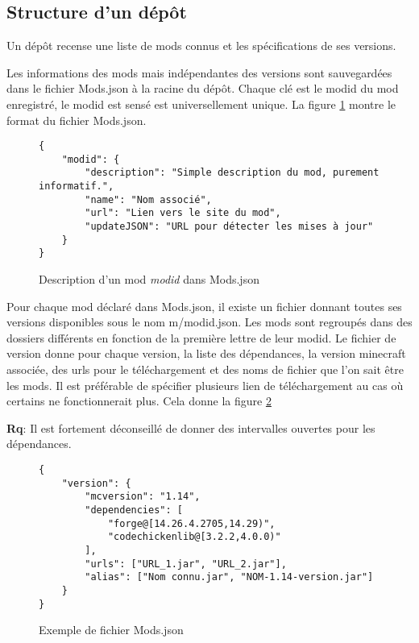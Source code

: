\documentclass{article}
\newcommand{\remarque}[0]{\par\noindent\textbf{Rq}: }
\begin{document}
\subsection{Structure d'un dépôt}
Un dépôt recense une liste de mods connus et les spécifications de ses versions.

Les informations des mods mais indépendantes des versions sont sauvegardées dans le fichier \textsf{Mods.json} à la racine du dépôt.
Chaque clé est le modid du mod enregistré, le modid est sensé est universellement unique.
La figure \ref{fig:Mods.json} montre le format du fichier \textsf{Mods.json}.

\begin{figure}[h]
\begin{verbatim}
{
    "modid": {
        "description": "Simple description du mod, purement informatif.",
        "name": "Nom associé",
        "url": "Lien vers le site du mod",
        "updateJSON": "URL pour détecter les mises à jour"
    }
}
\end{verbatim}
\caption{Description d'un mod \textit{modid} dans \textsf{Mods.json}}
\label{fig:Mods.json}
\end{figure}

Pour chaque mod déclaré dans \textsf{Mods.json}, il existe un fichier donnant toutes ses versions disponibles sous le nom \textsf{m/modid.json}.
Les mods sont regroupés dans des dossiers différents en fonction de la première lettre de leur modid.
Le fichier de version donne pour chaque version, la liste des dépendances, la version minecraft associée, des urls pour le téléchargement et des noms de fichier que l'on sait être les mods.
Il est préférable de spécifier plusieurs lien de téléchargement au cas où certains ne fonctionnerait plus.
Cela donne la figure \ref{fig:cofhcore.json}

\remarque Il est fortement déconseillé de donner des intervalles ouvertes pour les dépendances.

\begin{figure}[h]
\begin{verbatim}
{
    "version": {
        "mcversion": "1.14",
        "dependencies": [
            "forge@[14.26.4.2705,14.29)",
            "codechickenlib@[3.2.2,4.0.0)"
        ],
        "urls": ["URL_1.jar", "URL_2.jar"],
        "alias": ["Nom connu.jar", "NOM-1.14-version.jar"]
    }
}
\end{verbatim}
\caption{Exemple de fichier \textsf{Mods.json}}
\label{fig:cofhcore.json}
\end{figure}
\end{document}

